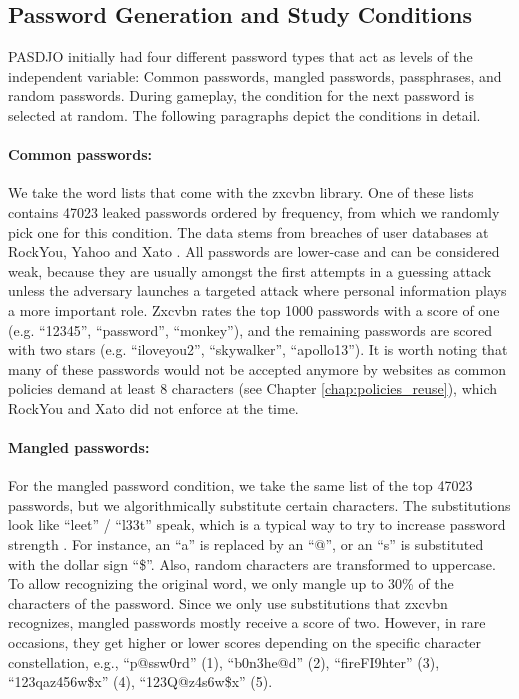 \subsection{Password Generation and Study Conditions}
\makeatletter
PASDJO initially had four different password types that act as levels of the independent variable: Common passwords, mangled passwords, passphrases, and random passwords. During gameplay, the condition for the next password is selected at random. The following paragraphs depict the conditions in detail. 

\paragraph{Common passwords: } We take the word lists that come with the zxcvbn library. One of these lists contains 47023 leaked passwords ordered by frequency, from which we randomly pick one for this condition. The data stems from breaches of user databases at RockYou, Yahoo and Xato \cite{Wheeler2016zxcvbn}. All passwords are lower-case and can be considered weak, because they are usually amongst the first attempts in a guessing attack \cite{Ur2015MeasuringRealWorldAccuracies} unless the adversary launches a targeted attack where personal information plays a more important role. Zxcvbn rates the top 1000 passwords with a score of one (e.g. ``12345'', ``password'', ``monkey''), and the remaining passwords are scored with two stars (e.g. ``iloveyou2'', ``skywalker'', ``apollo13''). It is worth noting that many of these passwords would not be accepted anymore by websites as common policies demand at least 8 characters (see Chapter \ref{chap:policies_reuse}), which RockYou and Xato did not enforce at the time. %

\paragraph{Mangled passwords: } For the mangled password condition, we take the same list of the top 47023 passwords, but we algorithmically substitute certain characters. The substitutions look like ``leet''  / ``l33t'' speak, which is a typical way to try to increase password strength \cite{Das2014TangledWeb, Mazurek2013Measuring}. For instance, an ``a'' is replaced by an ``@'', or an ``s'' is substituted with the dollar sign ``\$''. Also, random characters are transformed to uppercase. To allow recognizing the original word, we only mangle up to 30\% of the characters of the password. Since we only use substitutions that zxcvbn recognizes, mangled passwords mostly receive a score of two. However, in rare occasions, they get higher or lower scores depending on the specific character constellation, e.g., ``p@ssw0rd'' (1), ``b0n3he@d'' (2), ``fireFI9hter'' (3), ``123qaz456w\$x'' (4), ``123Q@z4s6w\$x'' (5). 

